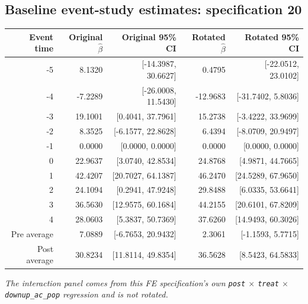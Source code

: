 \documentclass[10pt]{article}
\begin{document}
\subsection*{Baseline event-study estimates: specification 20}
\begin{center}
\scriptsize
\begin{tabular}{r rr rr}
\toprule
Event time & Original $\hat\beta$ & Original 95\% CI & Rotated $\hat\beta$ & Rotated 95\% CI \\
\midrule
-5 & 8.1320 & [-14.3987, 30.6627] & 0.4795 & [-22.0512, 23.0102] \\
-4 & -7.2289 & [-26.0008, 11.5430] & -12.9683 & [-31.7402, 5.8036] \\
-3 & 19.1001 & [0.4041, 37.7961] & 15.2738 & [-3.4222, 33.9699] \\
-2 & 8.3525 & [-6.1577, 22.8628] & 6.4394 & [-8.0709, 20.9497] \\
-1 & 0.0000 & [0.0000, 0.0000] & 0.0000 & [0.0000, 0.0000] \\
0 & 22.9637 & [3.0740, 42.8534] & 24.8768 & [4.9871, 44.7665] \\
1 & 42.4207 & [20.7027, 64.1387] & 46.2470 & [24.5289, 67.9650] \\
2 & 24.1094 & [0.2941, 47.9248] & 29.8488 & [6.0335, 53.6641] \\
3 & 36.5630 & [12.9575, 60.1684] & 44.2155 & [20.6101, 67.8209] \\
4 & 28.0603 & [5.3837, 50.7369] & 37.6260 & [14.9493, 60.3026] \\
\midrule
Pre average & 7.0889 & [-6.7653, 20.9432] & 2.3061 & [-1.1593, 5.7715] \\
Post average & 30.8234 & [11.8114, 49.8354] & 36.5628 & [8.5423, 64.5833] \\
\bottomrule
\end{tabular}
\end{center}
\medskip
\textit{The interaction panel comes from this FE specification's own \texttt{post} $\times$ \texttt{treat} $\times$ \texttt{downup\_ac\_pop} regression and is not rotated.}
\clearpage
\end{document}
